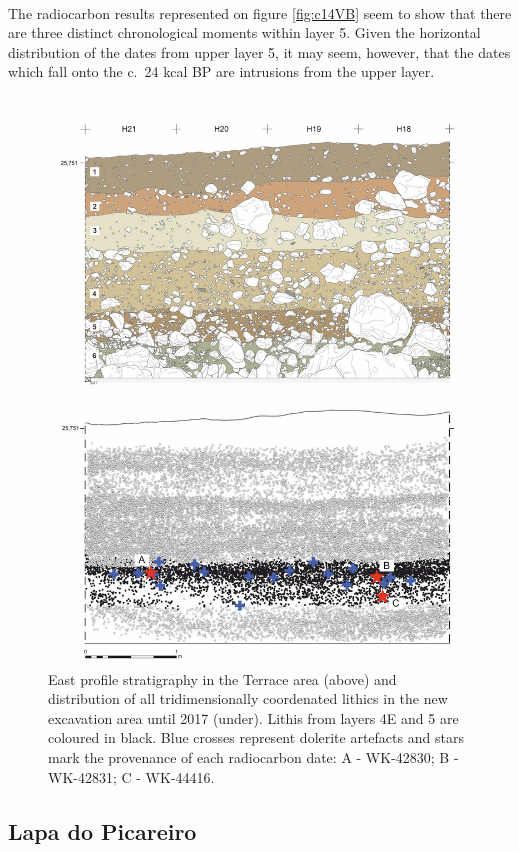 \documentclass[12pt,twoside]{reedthesis}
\begin{document}
~

The radiocarbon results represented on figure \ref{fig:c14VB} seem to show that there are three distinct chronological moments within layer 5. Given the horizontal distribution of the dates from upper layer 5, it may seem, however, that the dates which fall onto the c.~24 kcal BP are intrusions from the upper layer.
\begin{figure}[H]

{\centering \includegraphics[width=0.8\linewidth]{figure/SpatialanalysisVB} 

}

\caption{East profile stratigraphy in the Terrace area (above) and distribution of all tridimensionally coordenated lithics in the new excavation area until 2017 (under). Lithis from layers 4E and 5 are coloured in black. Blue crosses represent dolerite artefacts and stars mark the provenance of each radiocarbon date: A - WK-42830; B - WK-42831; C - WK-44416.}\label{fig:spatialvbfig}
\end{figure}
\hypertarget{lapa-do-picareiro-1}{%
\subsection{Lapa do Picareiro}\label{lapa-do-picareiro-1}}
\end{document}
